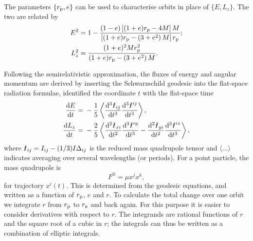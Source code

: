 The parameters $\{r_\mathrm{p},e\}$ can be used to characterise orbits in place of $\{E,L_z\}$. The two are related by
\begin{align}
E^2 = {} & 1 - \frac{(1 - e) \left[(1 + e)r_\mathrm{p} - 4M\right]M}{\left[(1 + e)r_\mathrm{p} - \left(3 + e^2\right)M\right]r_\mathrm{p}}; \\
L_z^2 = {} & \frac{(1 + e)^2 M r_\mathrm{p}^2}{(1 + e)r_\mathrm{p} - \left(3 + e^2\right)M}.
\end{align}

Following the semirelativistic approximation, the fluxes of energy and angular momentum are derived by inserting the Schwarzschild geodesic into the flat-space radiation formulae, identified the coordinate $t$ with the flat-space time \citep[chapter 36]{Misner1973}
\begin{align}
\diff{E}{t} = {} & -\recip{5}\left\langle \diffn{\Ibar_{ij}}{t}{3}\diffn{\Ibar^{ij}}{t}{3}\right\rangle,\\
\diff{L_z}{t} = {} & -\frac{2}{5}\left\langle\diffn{\Ibar_{xi}}{t}{2}\diffn{\Ibar^{iy}}{t}{3} - \diffn{\Ibar_{yi}}{t}{2}\diffn{\Ibar^{iz}}{t}{3}\right\rangle,
\end{align}
where $\Ibar_{ij} = I_{ij} - (1/3)I\upDelta_{ij}$ is the reduced mass quadrupole tensor and $\langle\ldots\rangle$ indicates averaging over several wavelengths (or periods). For a point particle, the mass quadrupole is
\begin{equation}
{I}^{jk} = \mu x^j x^k,
\end{equation}
for trajectory $x^i(t)$. This is determined from the geodesic equations, and written as a function of $r_\mathrm{p}$, $e$ and $r$. To calculate the total change over one orbit we integrate $r$ from $r_\mathrm{p}$ to $r_\mathrm{a}$ and back again. For this purpose it is easier to consider derivatives with respect to $r$. The integrands are rational functions of $r$ and the square root of a cubic in $r$; the integrals can thus be written as a combination of elliptic integrals.

